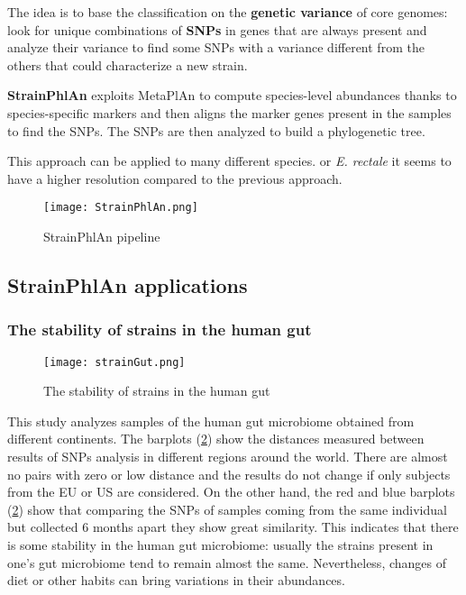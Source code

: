The idea is to base the classification on the \textbf{genetic variance} of core genomes: look for unique combinations of \textbf{SNPs} in genes that are always present and analyze their variance to find some SNPs with a variance different from the others that could characterize a new strain.

\textbf{StrainPhlAn} exploits MetaPlAn to compute species-level abundances thanks to species-specific markers and then aligns the marker genes present in the samples to find the SNPs. The SNPs are then analyzed to build a phylogenetic tree.

This approach can be applied to many different species. or \emph{E. rectale} it seems to have a higher resolution compared to the previous approach.

\begin{figure}[!h]
\centering
\texttt{[image: StrainPhlAn.png]}
\caption{\label{fig:strainphlan}StrainPhlAn pipeline}
\end{figure}

\subsection{StrainPhlAn applications}

\subsubsection{The stability of strains in the human gut}

\begin{figure}[!h]
\centering
\texttt{[image: strainGut.png]}
\caption{\label{fig:gut}The stability of strains in the human gut}
\end{figure}

This study analyzes samples of the human gut microbiome obtained from different continents. The barplots (\ref{fig:gut}) show the distances measured between results of SNPs analysis in different regions around the world. There are almost no pairs with zero or low distance and the results do not change if only subjects from the EU or US are considered.
On the other hand, the red and blue barplots (\ref{fig:gut}) show that comparing the SNPs of samples coming from the same individual but collected $6$ months apart they show great similarity. This indicates that there is some stability in the human gut microbiome: usually the strains present in one’s gut microbiome tend to remain almost the same. Nevertheless, changes of diet or other habits can bring variations in their abundances.

